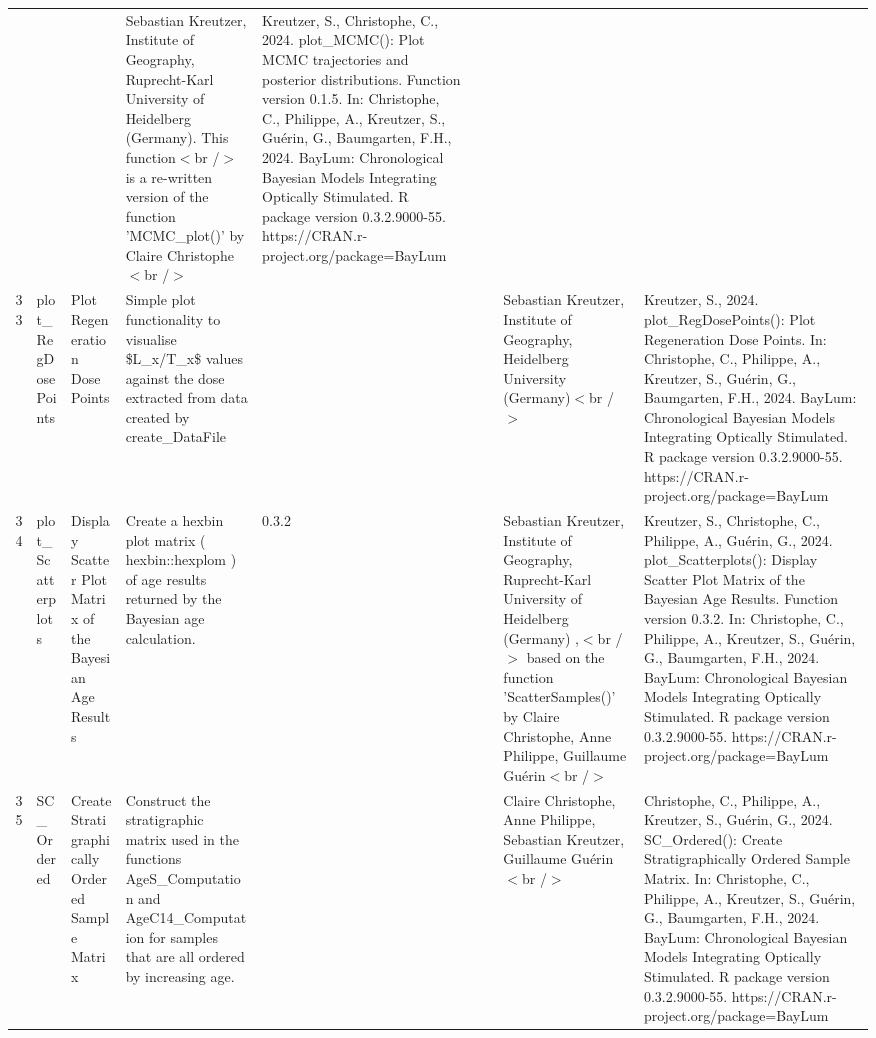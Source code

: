 \begin{table}[ht]
\begin{tabular}{rllllllll}
 &  &  & Sebastian Kreutzer, Institute of Geography, Ruprecht-Karl University of Heidelberg (Germany). This function$<$br /$>$ is a re-written version of the function 'MCMC\_plot()' by Claire Christophe$<$br /$>$ & Kreutzer, S., Christophe, C., 2024. plot\_MCMC(): Plot MCMC trajectories and posterior distributions. Function version 0.1.5. In: Christophe, C., Philippe, A., Kreutzer, S., Guérin, G., Baumgarten, F.H., 2024. BayLum: Chronological Bayesian Models Integrating Optically Stimulated. R package version 0.3.2.9000-55. https://CRAN.r-project.org/package=BayLum
 \\ 
  33 & plot\_RegDosePoints & Plot Regeneration Dose Points & Simple plot functionality to visualise \$L\_x/T\_x\$ values against the dose extracted from data created by  create\_DataFile &  &  &  & Sebastian Kreutzer, Institute of Geography, Heidelberg University (Germany)$<$br /$>$ & Kreutzer, S., 2024. plot\_RegDosePoints(): Plot Regeneration Dose Points. In: Christophe, C., Philippe, A., Kreutzer, S., Guérin, G., Baumgarten, F.H., 2024. BayLum: Chronological Bayesian Models Integrating Optically Stimulated. R package version 0.3.2.9000-55. https://CRAN.r-project.org/package=BayLum
 \\ 
  34 & plot\_Scatterplots & Display Scatter Plot Matrix of the Bayesian Age Results & Create a hexbin plot matrix ( hexbin::hexplom ) of age results returned by the Bayesian age calculation. & 0.3.2
 &  &  & Sebastian Kreutzer, Institute of Geography, Ruprecht-Karl University of Heidelberg (Germany) ,$<$br /$>$ based on the function 'ScatterSamples()' by Claire Christophe, Anne Philippe, Guillaume Guérin$<$br /$>$ & Kreutzer, S., Christophe, C., Philippe, A., Guérin, G., 2024. plot\_Scatterplots(): Display Scatter Plot Matrix of the Bayesian Age Results. Function version 0.3.2. In: Christophe, C., Philippe, A., Kreutzer, S., Guérin, G., Baumgarten, F.H., 2024. BayLum: Chronological Bayesian Models Integrating Optically Stimulated. R package version 0.3.2.9000-55. https://CRAN.r-project.org/package=BayLum
 \\ 
  35 & SC\_Ordered & Create Stratigraphically Ordered Sample Matrix & Construct the stratigraphic matrix used in the functions  AgeS\_Computation  and  AgeC14\_Computation  for samples that are all ordered by increasing age. &  &  &  & Claire Christophe, Anne Philippe, Sebastian Kreutzer, Guillaume Guérin$<$br /$>$ & Christophe, C., Philippe, A., Kreutzer, S., Guérin, G., 2024. SC\_Ordered(): Create Stratigraphically Ordered Sample Matrix. In: Christophe, C., Philippe, A., Kreutzer, S., Guérin, G., Baumgarten, F.H., 2024. BayLum: Chronological Bayesian Models Integrating Optically Stimulated. R package version 0.3.2.9000-55. https://CRAN.r-project.org/package=BayLum

\end{tabular}
\end{table}
